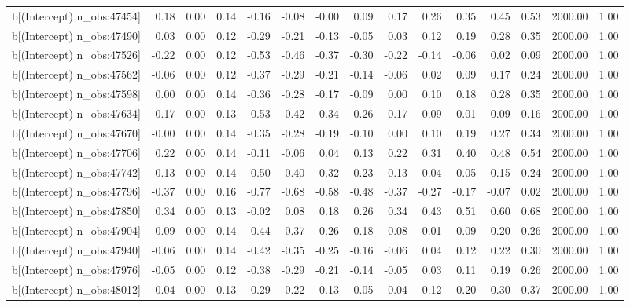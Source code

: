 \begin{table}[ht]
\begin{tabular}{rrrrrrrrrrrrrrr}
  b[(Intercept) n\_obs:47454] & 0.18 & 0.00 & 0.14 & -0.16 & -0.08 & -0.00 & 0.09 & 0.17 & 0.26 & 0.35 & 0.45 & 0.53 & 2000.00 & 1.00 \\ 
  b[(Intercept) n\_obs:47490] & 0.03 & 0.00 & 0.12 & -0.29 & -0.21 & -0.13 & -0.05 & 0.03 & 0.12 & 0.19 & 0.28 & 0.35 & 2000.00 & 1.00 \\ 
  b[(Intercept) n\_obs:47526] & -0.22 & 0.00 & 0.12 & -0.53 & -0.46 & -0.37 & -0.30 & -0.22 & -0.14 & -0.06 & 0.02 & 0.09 & 2000.00 & 1.00 \\ 
  b[(Intercept) n\_obs:47562] & -0.06 & 0.00 & 0.12 & -0.37 & -0.29 & -0.21 & -0.14 & -0.06 & 0.02 & 0.09 & 0.17 & 0.24 & 2000.00 & 1.00 \\ 
  b[(Intercept) n\_obs:47598] & 0.00 & 0.00 & 0.14 & -0.36 & -0.28 & -0.17 & -0.09 & 0.00 & 0.10 & 0.18 & 0.28 & 0.35 & 2000.00 & 1.00 \\ 
  b[(Intercept) n\_obs:47634] & -0.17 & 0.00 & 0.13 & -0.53 & -0.42 & -0.34 & -0.26 & -0.17 & -0.09 & -0.01 & 0.09 & 0.16 & 2000.00 & 1.00 \\ 
  b[(Intercept) n\_obs:47670] & -0.00 & 0.00 & 0.14 & -0.35 & -0.28 & -0.19 & -0.10 & 0.00 & 0.10 & 0.19 & 0.27 & 0.34 & 2000.00 & 1.00 \\ 
  b[(Intercept) n\_obs:47706] & 0.22 & 0.00 & 0.14 & -0.11 & -0.06 & 0.04 & 0.13 & 0.22 & 0.31 & 0.40 & 0.48 & 0.54 & 2000.00 & 1.00 \\ 
  b[(Intercept) n\_obs:47742] & -0.13 & 0.00 & 0.14 & -0.50 & -0.40 & -0.32 & -0.23 & -0.13 & -0.04 & 0.05 & 0.15 & 0.24 & 2000.00 & 1.00 \\ 
  b[(Intercept) n\_obs:47796] & -0.37 & 0.00 & 0.16 & -0.77 & -0.68 & -0.58 & -0.48 & -0.37 & -0.27 & -0.17 & -0.07 & 0.02 & 2000.00 & 1.00 \\ 
  b[(Intercept) n\_obs:47850] & 0.34 & 0.00 & 0.13 & -0.02 & 0.08 & 0.18 & 0.26 & 0.34 & 0.43 & 0.51 & 0.60 & 0.68 & 2000.00 & 1.00 \\ 
  b[(Intercept) n\_obs:47904] & -0.09 & 0.00 & 0.14 & -0.44 & -0.37 & -0.26 & -0.18 & -0.08 & 0.01 & 0.09 & 0.20 & 0.26 & 2000.00 & 1.00 \\ 
  b[(Intercept) n\_obs:47940] & -0.06 & 0.00 & 0.14 & -0.42 & -0.35 & -0.25 & -0.16 & -0.06 & 0.04 & 0.12 & 0.22 & 0.30 & 2000.00 & 1.00 \\ 
  b[(Intercept) n\_obs:47976] & -0.05 & 0.00 & 0.12 & -0.38 & -0.29 & -0.21 & -0.14 & -0.05 & 0.03 & 0.11 & 0.19 & 0.26 & 2000.00 & 1.00 \\ 
  b[(Intercept) n\_obs:48012] & 0.04 & 0.00 & 0.13 & -0.29 & -0.22 & -0.13 & -0.05 & 0.04 & 0.12 & 0.20 & 0.30 & 0.37 & 2000.00 & 1.00 \\ 

\end{tabular}
\end{table}
